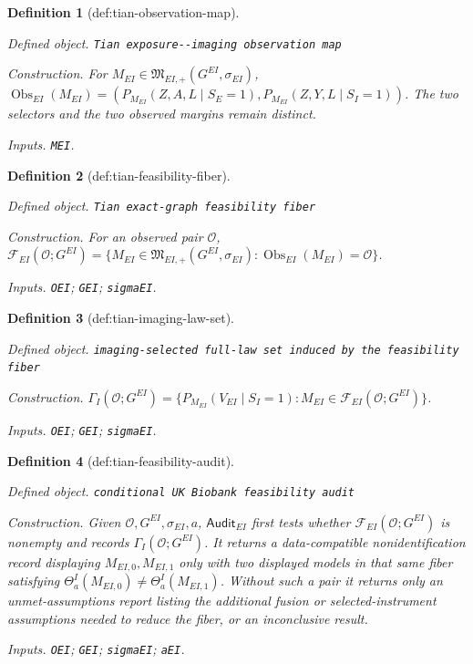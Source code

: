 \documentclass{article}
\newtheorem{definition}{Definition}
\begin{document}
\begin{definition}[def:tian-observation-map]\label{def:tian-observation-map}
\par\smallskip\noindent\emph{Defined object.} \texttt{Tian exposure-\allowbreak{}-\allowbreak{}imaging observation map}
\par\smallskip\noindent\emph{Construction.} For \(M_{EI}\in\mathfrak M_{EI,+}(G^{EI},\sigma_{EI})\), \(\operatorname{Obs}_{EI}(M_{EI})=(P_{M_{EI}}(Z,A,L\mid S_E=1),P_{M_{EI}}(Z,Y,L\mid S_I=1))\). The two selectors and the two observed margins remain distinct.
\par\smallskip\noindent\emph{Inputs.} \texttt{MEI}.
\end{definition}

\begin{definition}[def:tian-feasibility-fiber]\label{def:tian-feasibility-fiber}
\par\smallskip\noindent\emph{Defined object.} \texttt{Tian exact-\allowbreak{}graph feasibility fiber}
\par\smallskip\noindent\emph{Construction.} For an observed pair \(\mathcal O\), \(\mathcal F_{EI}(\mathcal O;G^{EI})=\{M_{EI}\in\mathfrak M_{EI,+}(G^{EI},\sigma_{EI}):\operatorname{Obs}_{EI}(M_{EI})=\mathcal O\}\).
\par\smallskip\noindent\emph{Inputs.} \texttt{OEI}; \texttt{GEI}; \texttt{sigmaEI}.
\end{definition}

\begin{definition}[def:tian-imaging-law-set]\label{def:tian-imaging-law-set}
\par\smallskip\noindent\emph{Defined object.} \texttt{imaging-\allowbreak{}selected full-\allowbreak{}law set induced by the feasibility fiber}
\par\smallskip\noindent\emph{Construction.} \(\Gamma_I(\mathcal O;G^{EI})=\{P_{M_{EI}}(V_{EI}\mid S_I=1):M_{EI}\in\mathcal F_{EI}(\mathcal O;G^{EI})\}\).
\par\smallskip\noindent\emph{Inputs.} \texttt{OEI}; \texttt{GEI}; \texttt{sigmaEI}.
\end{definition}

\begin{definition}[def:tian-feasibility-audit]\label{def:tian-feasibility-audit}
\par\smallskip\noindent\emph{Defined object.} \texttt{conditional UK Biobank feasibility audit}
\par\smallskip\noindent\emph{Construction.} Given \(\mathcal O,G^{EI},\sigma_{EI},a\), \(\mathsf{Audit}_{EI}\) first tests whether \(\mathcal F_{EI}(\mathcal O;G^{EI})\) is nonempty and records \(\Gamma_I(\mathcal O;G^{EI})\). It returns a data-compatible nonidentification record displaying \(M_{EI,0},M_{EI,1}\) only with two displayed models in that same fiber satisfying \(\Theta^I_a(M_{EI,0})\ne\Theta^I_a(M_{EI,1})\). Without such a pair it returns only an unmet-assumptions report listing the additional fusion or selected-instrument assumptions needed to reduce the fiber, or an inconclusive result.
\par\smallskip\noindent\emph{Inputs.} \texttt{OEI}; \texttt{GEI}; \texttt{sigmaEI}; \texttt{aEI}.
\end{definition}
\end{document}
